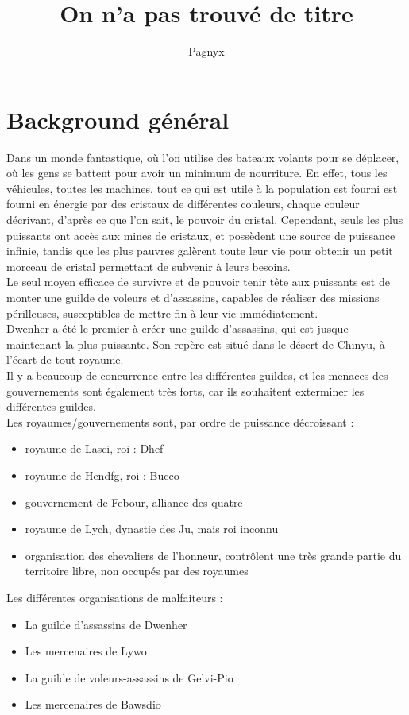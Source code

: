 \documentclass[11pt,a4paper]{book}
\author{Pagnyx}
\title{On n'a pas trouvé de titre}
\begin{document}
\chapter{Background général}

Dans un monde fantastique, où l'on utilise des bateaux volants pour se déplacer, où les gens se battent pour avoir un minimum de nourriture. En effet, tous les véhicules, toutes les machines, tout ce qui est utile à la population est fourni est fourni en énergie par des cristaux de différentes couleurs, chaque couleur décrivant, d'après ce que l'on sait, le pouvoir du cristal. Cependant, seuls les plus puissants ont accès aux mines de cristaux, et possèdent une source de puissance infinie, tandis que les plus pauvres galèrent toute leur vie pour obtenir un petit morceau de cristal permettant de subvenir à leurs besoins. \\
Le seul moyen efficace de survivre et de pouvoir tenir tête aux puissants est de monter une guilde de voleurs et d'assassins, capables de réaliser des missions périlleuses, susceptibles de mettre fin à leur vie immédiatement. \\
Dwenher a été le premier à créer une guilde d'assassins, qui est jusque maintenant la plus puissante. Son repère est situé dans le désert de Chinyu, à l'écart de tout royaume. \\
Il y a beaucoup de concurrence entre les différentes guildes, et les menaces des gouvernements sont également très forts, car ils souhaitent exterminer les différentes guildes. \\
Les royaumes/gouvernements sont, par ordre de puissance décroissant :
\begin{itemize}
	\item royaume de Lasci, roi : Dhef
	\item royaume de Hendfg, roi : Bucco
	\item gouvernement de Febour, alliance des quatre
	\item royaume de Lych, dynastie des Ju, mais roi inconnu
	\item organisation des chevaliers de l'honneur, contrôlent une très grande partie du territoire libre, non occupés par des royaumes
\end{itemize}
Les différentes organisations de malfaiteurs :
\begin{itemize}
	\item La guilde d'assassins de Dwenher
	\item Les mercenaires de Lywo
	\item La guilde de voleurs-assassins de Gelvi-Pio
	\item Les mercenaires de Bawsdio
\end{itemize}
\end{document}
